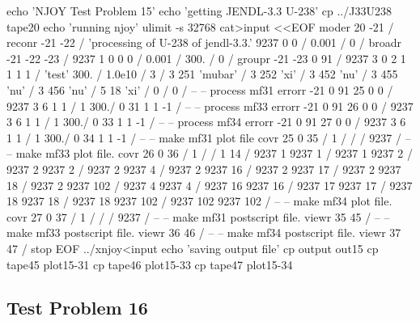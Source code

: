 \small
\begin{ccode}

echo 'NJOY Test Problem 15'
echo 'getting JENDL-3.3 U-238'
cp ../J33U238 tape20
echo 'running njoy'
ulimit -s 32768
cat>input <<EOF
moder
 20 -21 /
reconr
 -21 -22 /
 'processing of U-238 of jendl-3.3.'
9237 0 0 /
0.001 /
0 /
broadr
 -21 -22 -23 /
9237 1 0 0 0 /
0.001 /
300. /
0 /
groupr
 -21 -23 0 91 /
9237 3 0 2 1 1 1 1 /
'test'
300. /
1.0e10 /
3 /
3 251 'mubar' /
3 252 'xi' /
3 452 'nu' /
3 455 'nu' /
3 456 'nu' /
5 18  'xi' /
0 /
0 /
--
-- process mf31
errorr
 -21 0 91 25 0 0 /
9237 3 6 1 1 /
1 300./
0 31 1 1 -1 /
--
-- process mf33
errorr
 -21 0 91 26 0 0 /
9237 3 6 1 1 /
1 300./
0 33 1 1 -1 /
--
-- process mf34
errorr
 -21 0 91 27 0 0 /
9237 3 6 1 1 /
1 300./
0 34 1 1 -1 /
--
-- make mf31 plot file
covr
 25 0 35 /
 1 /
 /
 /
 9237 /
--
-- make mf33 plot file.
covr
 26 0 36 /
 1 /
 /
 1 14 /
 9237   1   9237   1 /
 9237   1   9237   2 /
 9237   2   9237   2 /
 9237   2   9237   4 /
 9237   2   9237  16 /
 9237   2   9237  17 /
 9237   2   9237  18 /
 9237   2   9237 102 /
 9237   4   9237   4 /
 9237  16   9237  16 /
 9237  17   9237  17 /
 9237  18   9237  18 /
 9237  18   9237 102 /
 9237 102   9237 102 /
--
-- make mf34 plot file.
covr
 27 0 37 /
 1 /
 /
 /
 9237 /
--
-- make mf31 postscript file.
viewr
 35 45 /
--
-- make mf33 postscript file.
viewr
 36 46 /
--
-- make mf34 postscript file.
viewr
 37 47 /
stop
EOF
../xnjoy<input
echo 'saving output file'
cp output out15
cp tape45 plot15-31
cp tape46 plot15-33
cp tape47 plot15-34

\end{ccode}
\normalsize

\subsection{Test Problem 16}
\label{ssMandT_16}

